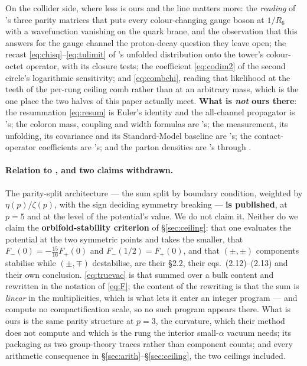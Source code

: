 \documentclass[11pt,a4paper]{article}
\begin{document}
\noindent On the collider side, where less is ours and the line matters more: the \emph{reading} of
\cite{KM25}'s three parity matrices that puts every colour-changing gauge boson at $1/R_6$ with a
wavefunction vanishing on the quark brane, and the observation that this answers for the gauge
channel the proton-decay question they leave open; the recast \eqref{eq:chisq}--\eqref{eq:tulimit}
of \cite{CMSangular}'s unfolded distribution onto the tower's colour-octet operator, with its
closure tests; the coefficient \eqref{eq:codim2} of the second circle's logarithmic sensitivity;
and \eqref{eq:combchi}, reading that likelihood at the teeth of the per-rung ceiling comb rather than
at an arbitrary mass, which is the one place the two halves of this paper actually meet. \textbf{What
is \emph{not} ours there}: the resummation \eqref{eq:resum} is Euler's identity and the
all-channel propagator is \cite{DMN01}'s; the coloron mass, coupling and width formulas are
\cite{Simmons97}'s; the measurement, its unfolding, its covariance and its Standard-Model baseline
are \cite{CMSangular}'s; the contact-operator coefficients are \cite{CIJET}'s; and the parton
densities are \cite{CT10,NNPDF31,CT14}'s through \cite{LHAPDF}.

\paragraph{Relation to \cite{CCD24}, and two claims withdrawn.} The parity-split architecture ---
the sum split by boundary condition, weighted by $\eta(p)/\zeta(p)$, with the sign deciding symmetry
breaking --- \textbf{is published}, at $p=5$ and at the level of the potential's value. We do not
claim it. Neither do we claim the \textbf{orbifold-stability criterion} of \S\ref{sec:ceiling}: that
one evaluates the potential at the two symmetric points and takes the smaller, that
$F_-(0)=-\tfrac{15}{16}F_+(0)$ and $F_-(1/2)=F_+(0)$, and that $(\pm,\pm)$ components stabilise
while $(\pm,\mp)$ destabilise, are their \S2.2, their eqs.~(2.12)--(2.13) and their own conclusion.
\eqref{eq:truevac} is that summed over a bulk content and rewritten in the notation of
\eqref{eq:F}; the content of the rewriting is that the sum is \emph{linear} in the multiplicities,
which is what lets it enter an integer program --- and \cite{CCD24} compute no compactification
scale, so no such program appears there. What is ours is the same parity structure at $p=3$, the
curvature, which their method does not compute and which is the rung the interior small-$\alpha$
vacuum needs; its packaging as two group-theory traces rather than component counts; and every
arithmetic consequence in \S\ref{sec:arith}--\S\ref{sec:ceiling}, the two ceilings included.
\end{document}
